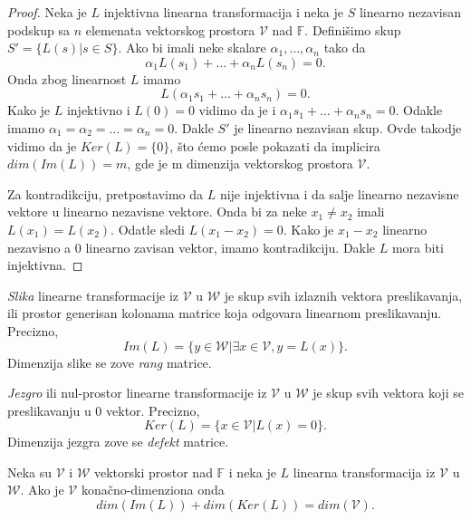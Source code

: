 \documentclass{article}
\begin{document}
\begin{proof}
  Neka je $L$ injektivna linearna transformacija i neka je $S$ linearno nezavisan podskup sa $n$ elemenata vektorskog prostora $\mathcal{V}$ nad $\mathbb{F}$.
  Definišimo skup $S' = \{L(s) | s \in S\}$.
  Ako bi imali neke skalare $\alpha_1, \ldots,\alpha_n$ tako da
  \[\alpha_1 L(s_1) + \ldots + \alpha_n L(s_n) = 0.\]
  Onda zbog linearnost $L$ imamo
  \[L(\alpha_1 s_1 + \ldots + \alpha_n s_n) = 0.\]
  Kako je $L$ injektivno i $L(0) = 0$ vidimo da je i $\alpha_1 s_1 + \ldots + \alpha_n s_n = 0$.
  Odakle imamo $\alpha_1 = \alpha_2 = \ldots = \alpha_n = 0$.
  Dakle $S'$ je linearno nezavisan skup.
  Ovde takodje vidimo da je $Ker(L) = \{0\}$, što ćemo posle pokazati da implicira $dim(Im(L)) = m$, gde je m dimenzija vektorskog prostora $\mathcal{V}$.


  Za kontradikciju, pretpostavimo da $L$ nije injektivna i da salje linearno nezavisne vektore u linearno nezavisne vektore.
  Onda bi za neke $x_1 \neq x_2$ imali $L(x_1) = L(x_2)$.
  Odatle sledi $L(x_1 - x_2) = 0$.
  Kako je $x_1 - x_2$ linearno nezavisno a $0$ linearno zavisan vektor, imamo kontradikciju.
  Dakle $L$ mora biti injektivna.
\end{proof}

\begin{definition}[Slika]
  \textit{Slika} linearne transformacije iz $\mathcal{V}$ u $\mathcal{W}$ je skup svih izlaznih vektora preslikavanja, ili prostor generisan kolonama matrice koja odgovara linearnom preslikavanju.
  Precizno, 
  \[Im(L) = \{y \in \mathcal{W} | \exists x \in \mathcal{V}, y = L(x)\}.\]
  Dimenzija slike se zove \textit{rang} matrice.
\end{definition}

\begin{definition}[Jezgro]
  \textit{Jezgro} ili nul-prostor linearne transformacije iz $\mathcal{V}$ u $\mathcal{W}$ je skup svih vektora koji se preslikavanju u $0$ vektor.
  Precizno, 
  \[Ker(L) = \{x \in \mathcal{V} | L(x) = 0\}.\]
  Dimenzija jezgra zove se \textit{defekt} matrice.
\end{definition}

\begin{theorem}
  Neka su $\mathcal{V}$ i $\mathcal{W}$ vektorski prostor nad $\mathbb{F}$ i neka je $L$ linearna transformacija iz $\mathcal{V}$ u $\mathcal{W}$.
  Ako je $\mathcal{V}$ konačno-dimenziona onda
  \[dim(Im(L)) + dim(Ker(L)) = dim(\mathcal{V}).\]
\end{theorem}
\end{document}
